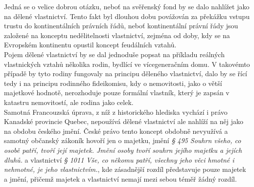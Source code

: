 \documentclass{article}
\begin{document}

Jedná se o velice dobrou otázku, neboť na svěřenský fond by se dalo nahlížet jako na dělené vlastnictví. Tento fakt byl dlouhou dobu povážován za překážku vstupu trustu do kontinentálních právních řádů, neboť kontinentální právní řády jsou založené na konceptu nedělitelnosti vlastnictví, zejména od doby, kdy se na Evropském kontinentu opustil koncept feudálních vztahů.\\

Pojem dělené vlastnictví by se dal jednoduše popsat na příkladu reálných vlastnických vztahů několika rodin, bydlící ve vícegeneračním domu. V takovémto případě by tyto rodiny fungovaly na principu děleného vlastnictví, dalo by se řící tedy i na principu rodinného fideikomisu, kdy o nemovitosti, jako o větší majetkové hodnotě, nerozhoduje pouze formální vlastník, který je zapsán v katastru nemovitostí, ale rodina jako celek.\\

Samotná Francouzská úprava, z níž z historického hlediska vychází i právo Kanadské provincie Quebec, nepoužívá dělené vlastnictví ale nahlíží na něj jako na obdobu českého jmění. České právo tento koncept obdobně nevyužívá a samotný občanský zákoník hovoří jen o majetku, jmění \textit{§ 495 Souhrn všeho, co osobě patří, tvoří její majetek. Jmění osoby tvoří souhrn jejího majetku a jejích dluhů.} a vlastnictví \textit{§ 1011 Vše, co někomu patří, všechny jeho věci hmotné i nehmotné, je jeho vlastnictvím.}, kde zásadnější rozdíl představuje pouze majetek a jmění, přičemž majetek a vlastnictví nemají mezi sebou téměř žádný rozdíl.\\
\end{document}

